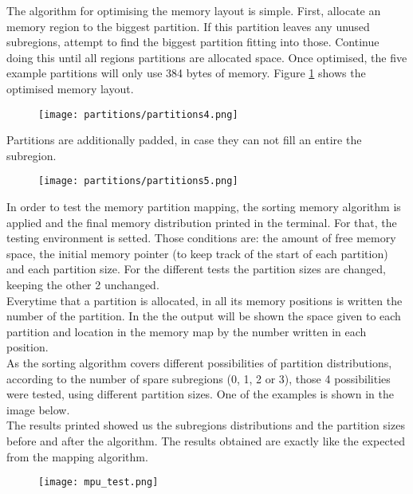 The algorithm for optimising the memory layout is simple. First, allocate an
memory region to the biggest partition. If this partition leaves any unused
subregions, attempt to find the biggest partition fitting into those. Continue
doing this until all regions partitions are allocated space.
Once optimised, the five example partitions will only use 384 bytes of memory.
Figure \ref{fig:ce4} shows the optimised memory layout.\\
\begin{figure}[H]
\centering
\texttt{[image: partitions/partitions4.png]}
\label{fig:ce4}
\end{figure}
Partitions are additionally padded, in case they can not fill an entire the subregion.\\
\begin{figure}[H]
\centering
\texttt{[image: partitions/partitions5.png]}
\label{fig:ce5}
\end{figure}

In order to test the memory partition mapping, the sorting memory algorithm is applied and the final 
memory distribution printed in the terminal. For that, the testing environment is setted. Those conditions 
are: the amount of free memory space, the initial memory pointer (to keep track of the start of each 
partition) and each partition size. For the different tests the partition sizes are changed, keeping the 
other 2 unchanged.\\
Everytime that a partition is allocated, in all its memory positions is written the number of the 
partition. In the the output will be shown the space given to each partition and location in the memory 
map by the number written in each position.\\
As the sorting algorithm covers different possibilities of partition distributions, according to the 
number of spare subregions (0, 1, 2 or 3), those 4 possibilities were tested, using different 
partition sizes. One of the examples is shown in the image below.\\
The results printed showed us the subregions distributions and the partition sizes before and 
after the algorithm. The results obtained are exactly like the expected from the mapping algorithm.\\

\begin{figure}[H]
\centering
\texttt{[image: mpu\_test.png]}
\label{fig:testing_mpu}
\end{figure}



